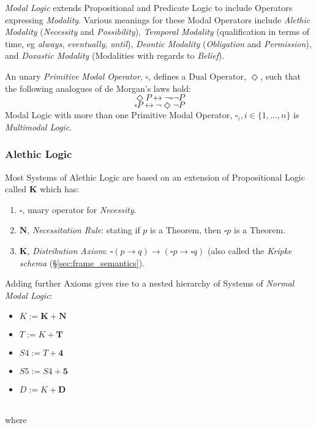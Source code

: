 \documentclass{article}
\begin{document}
\emph{Modal Logic} extends Propositional and Predicate Logic to
include Operators expressing \emph{Modality}. Various meanings for
these Modal Operators include \emph{Alethic Modality}
(\emph{Necessity} and \emph{Possibility}), \emph{Temporal Modality}
(qualification in terms of time, eg \emph{always}, \emph{eventually},
\emph{until}), \emph{Deontic Modality} (\emph{Obligation} and
\emph{Permission}), and \emph{Doxastic Modality} (Modalities with
regards to \emph{Belief}).

An unary \emph{Primitive Modal Operator}, $\square$, defines a Dual
Operator, $\Diamond$, such that the following analogues of de Morgan's
laws hold:
    \[\Diamond P \leftrightarrow \neg \square \neg P\]
    \[\square P \leftrightarrow \neg \Diamond \neg P\]
Modal Logic with more than one Primitive Modal Operator, $\square _i,
i \in \{1, \ldots, n\}$ is \emph{Multimodal Logic}.

\subsubsection{Alethic Logic}\label{subsec:alethic_logic}

Most Systems of Alethic Logic are based on an extension of
Propositional Logic called $\mathbf{K}$ which has:

\begin{enumerate}
\item $\square$, unary operator for \emph{Necessity}.
\item $\mathbf{N}$, \emph{Necessitation Rule}: stating if $p$ is a
  Theorem, then $\square p$ is a Theorem.
\item $\mathbf{K}$, \emph{Distribution Axiom}: $\square(p \rightarrow
  q) \rightarrow (\square p \rightarrow \square q)$ (also called the
  \emph{Kripke schema} (\S\ref{sec:frame_semantics}).
\end{enumerate}

Adding further Axioms gives rise to a nested hierarchy of Systems of
\emph{Normal Modal Logic}:

\begin{itemize}
\item $K := \mathbf{K} + \mathbf{N}$
\item $T := K + \mathbf{T}$
\item $S4 := T + \mathbf{4}$
\item $S5 := S4 + \mathbf{5}$
\item $D := K + \mathbf{D}$
\end{itemize} \hfill \\
where
\end{document}
